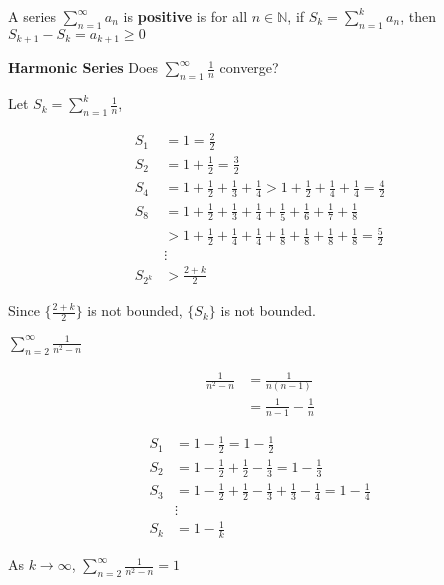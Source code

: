 

\begin{defn}
A series $\sum_{n=1}^\infty a_n$ is \textbf{positive} is for all $n\in \mathbb{N}$, if $S_k=\sum_{n=1}^k a_n$, then $S_{k+1} - S_k = a_{k+1}\geq 0$
\end{defn}

\begin{exmp}
\textbf{Harmonic Series} Does $\displaystyle\sum_{n=1}^\infty \frac{1}{n}$ converge?
\end{exmp}

Let $\displaystyle S_k = \sum_{n=1}^k \frac{1}{n}$,

\begin{align*}
    S_1 &= 1 = \frac{2}{2}\\
    S_2 &= 1 + \frac{1}{2} =\frac{3}{2}\\
    S_4 &= 1+ \frac{1}{2} +\frac{1}{3}+\frac{1}{4}>1+\frac{1}{2}+\frac{1}{4}+\frac{1}{4} = \frac{4}{2}\\
    S_8 &= 1 + \frac{1}{2} +\frac{1}{3} +\frac{1}{4} +\frac{1}{5} +\frac{1}{6} +\frac{1}{7} +\frac{1}{8} \\
        &> 1 + \frac{1}{2} +\frac{1}{4} +\frac{1}{4} +\frac{1}{8} +\frac{1}{8} +\frac{1}{8} +\frac{1}{8} = \frac{5}{2}\\
    & \vdots \\
    S_{2^k} &> \frac{2+k}{2}
\end{align*}

Since $\displaystyle\{\frac{2+k}{2}\}$ is not bounded, $\{S_k\}$ is not bounded.

\begin{exmp}
$\displaystyle\sum_{n=2}^\infty \frac{1}{n^2-n}$
\end{exmp}

\begin{note}
\begin{align*}
    \frac{1}{n^2-n} & = \frac{1}{n(n-1)}\\
    & = \frac{1}{n-1} - \frac{1}{n}
\end{align*}
\end{note}

\begin{solution}

\begin{align*}
    S_1 &= 1 - \frac{1}{2} = 1 - \frac{1}{2}\\
    S_2 &= 1 - \frac{1}{2} + \frac{1}{2} - \frac{1}{3} = 1 - \frac{1}{3}\\
     S_3 &= 1 - \frac{1}{2} + \frac{1}{2} - \frac{1}{3} + \frac{1}{3} - \frac{1}{4} = 1 - \frac{1}{4}\\
     &\vdots \\
     S_k & = 1 - \frac{1}{k}
\end{align*}


As $k\to \infty$, $\displaystyle\sum_{n=2}^\infty \frac{1}{n^2-n} = 1$
\end{solution}


